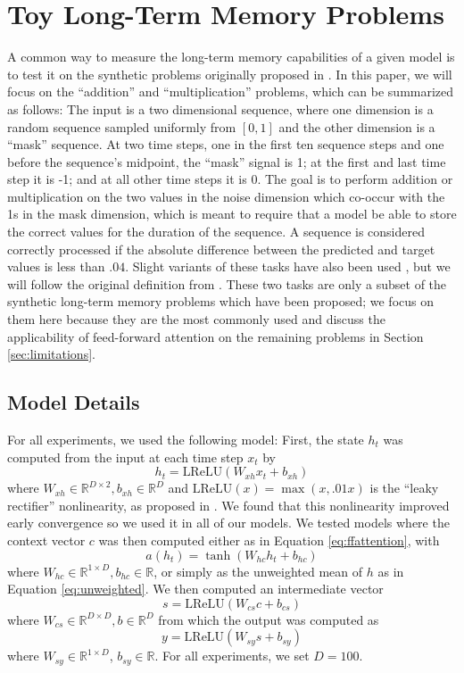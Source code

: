 \documentclass{article} %
\begin{document}
\section{Toy Long-Term Memory Problems}

A common way to measure the long-term memory capabilities of a given model is to test it on the synthetic problems originally proposed in \cite{hochreiter1997long}.
In this paper, we will focus on the ``addition'' and ``multiplication'' problems, which can be summarized as follows:
The input is a two dimensional sequence, where one dimension is a random sequence sampled uniformly from $[0, 1]$ and the other dimension is a ``mask'' sequence.
At two time steps, one in the first ten sequence steps and one before the sequence's midpoint, the ``mask'' signal is 1; at the first and last time step it is -1; and at all other time steps it is 0.
The goal is to perform addition or multiplication on the two values in the noise dimension which co-occur with the 1s in the mask dimension, which is meant to require that a model be able to store the correct values for the duration of the sequence.
A sequence is considered correctly processed if the absolute difference between the predicted and target values is less than $.04$.
Slight variants of these tasks have also been used \cite{sutskever2013importance,le2015simple,jaegar2012long,martens2011learning}, but we will follow the original definition from \cite{hochreiter1997long}.
These two tasks are only a subset of the synthetic long-term memory problems which have been proposed; we focus on them here because they are the most commonly used and discuss the applicability of feed-forward attention on the remaining problems in Section \ref{sec:limitations}.

\subsection{Model Details}

For all experiments, we used the following model:
First, the state $h_t$ was computed from the input at each time step $x_t$ by 
$$
h_t = \textrm{LReLU}(W_{xh}x_t + b_{xh})
$$
where $W_{xh} \in \mathbb{R}^{D \times 2}, b_{xh} \in \mathbb{R}^D$ and $\textrm{LReLU}(x) = \max(x, .01x)$ is the ``leaky rectifier'' nonlinearity, as proposed in \cite{maas2013rectifier}.
We found that this nonlinearity improved early convergence so we used it in all of our models.
We tested models where the context vector $c$ was then computed either as in Equation \ref{eq:ffattention}, with 
$$
a(h_t) =\tanh(W_{hc}h_t + b_{hc})
$$
where $W_{hc} \in \mathbb{R}^{1 \times D}, b_{hc} \in \mathbb{R}$, or simply as the unweighted mean of $h$ as in Equation \ref{eq:unweighted}.
We then computed an intermediate vector 
$$
s = \textrm{LReLU}(W_{cs}c + b_{cs})
$$
where $W_{cs} \in \mathbb{R}^{D \times D}, b \in \mathbb{R}^D$ from which the output was computed as
$$
y = \textrm{LReLU}(W_{sy}s + b_{sy})
$$
where $W_{sy} \in \mathbb{R}^{1 \times D}$, $b_{sy} \in \mathbb{R}$.
For all experiments, we set $D = 100$.
\end{document}
